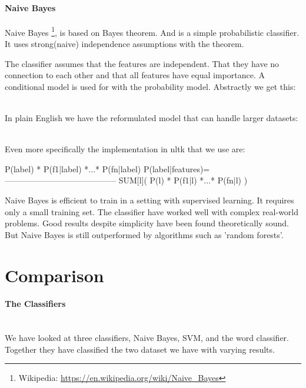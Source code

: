 \paragraph{Naive Bayes}\label{sentiment:naive_bayes_classification}
Naive Bayes \footnote{Wikipedia:
\url{https://en.wikipedia.org/wiki/Naive_Bayes}}, is based on Bayes theorem. And
is a simple probabilistic classifier. It uses strong(naive) independence
assumptions with the theorem.

The classifier assumes that the features are independent. That they have no
connection to each other and that all features have equal importance. 
A conditional model is used for with the probability model. Abstractly we get
this: 

\\

In plain English we have the reformulated model that can handle larger datasets:

\\

Even more specifically the implementation in nltk that we use are: 
\begin{python}
                   P(label) * P(f1|label) *...* P(fn|label)
P(label|features)=-----------------------------------------
                   SUM[l]( P(l) * P(f1|l) *...* P(fn|l) )
\end{python}

Naive Bayes is efficient to train in a setting with supervised
learning. It requires only a small training set. The classifier have worked well
with complex real-world problems. Good results despite simplicity have been
found theoretically sound. But Naive Bayes is still outperformed by algorithms
such as 'random forests'.
%

\section{Comparison}\label{sentiment:comparison_results}
\paragraph{The Classifiers}
\hspace{0pt}\\
We have looked at three classifiers, Naive Bayes, SVM, and the word classifier.
Together they have classified the two dataset we have with varying results. 

